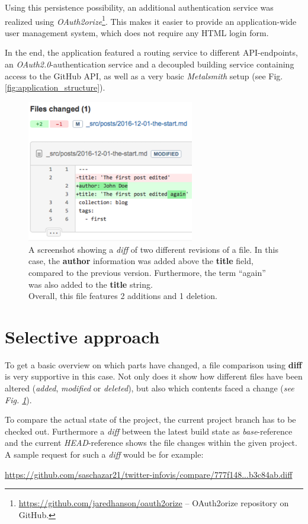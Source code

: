 \documentclass[a4paper,english,11pt]{report}
\begin{document}
Using this persistence possibility, an additional authentication service was realized using \emph{OAuth2orize}\footnote{\url{https://github.com/jaredhanson/oauth2orize} -- OAuth2orize repository on GitHub.}. This makes it easier to provide an application-wide user management system, which does not require any HTML login form.

In the end, the application featured a routing service to different API-endpoints, an \emph{OAuth2.0}-authentication service and a decoupled building service containing access to the GitHub API, as well as a very basic \emph{Metalsmith} setup (see Fig. \ref{fig:application_structure}).

%
\begin{figure}
    \centering
    \includegraphics[width=0.65\textwidth]{diff_sample.png}
    \caption{A screenshot showing a \emph{diff} of two different revisions of a file. In this case, the \textbf{author} information was added above the \textbf{title} field, compared to the previous version. Furthermore, the term ``again'' was also added to the \textbf{title} string.\\ Overall, this file features 2 additions and 1 deletion.}
    \label{fig:diff_sample}
\end{figure}
%

\section{Selective approach}
To get a basic overview on which parts have changed, a file comparison using \textbf{diff} is very supportive in this case. Not only does it show how different files have been altered (\emph{added}, \emph{modified} or \emph{deleted}), but also which contents faced a change (\emph{see Fig. \ref{fig:diff_sample}}).

To compare the actual state of the project, the current project branch has to be checked out. Furthermore a \emph{diff} between the latest build state as \emph{base}-reference and the current \emph{HEAD}-reference shows the file changes within the given project. A sample request for such a \emph{diff} would be for example:
\begin{center}
\url{https://github.com/saschazar21/twitter-infovis/compare/777f148...b3c84ab.diff}
\end{center}
\end{document}
